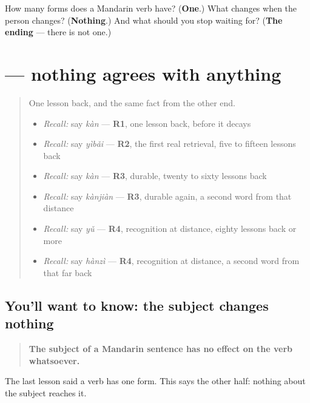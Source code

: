 \begin{tcolorbox}[breakable,colback=teal!4,colframe=teal!35!black,title={Before you move on}]
How many forms does a Mandarin verb have? (\textbf{One}.) What changes when the person changes? (\textbf{Nothing}.) And what should you stop waiting for? (\textbf{The ending} — there is not one.)
\end{tcolorbox}
\section[\texorpdfstring{\zh{我是} — \zh{你是} — \zh{人是} (wǒ shì)}{我是 — 你是 — 人是 (wǒ shì)}]{ — nothing agrees with anything}

\label{lesson:ZH-C22-buyizhi}



\begin{quote}
One lesson back, and the same fact from the other end.

\begin{itemize}
\raggedright
  \item \emph{Recall:} say \emph{kàn} — \textbf{R1}, one lesson back, before it decays
  \item \emph{Recall:} say \emph{yìbǎi} — \textbf{R2}, the first real retrieval, five to fifteen lessons back
  \item \emph{Recall:} say \emph{kàn} — \textbf{R3}, durable, twenty to sixty lessons back
  \item \emph{Recall:} say \emph{kànjiàn} — \textbf{R3}, durable again, a second word from that distance
  \item \emph{Recall:} say \emph{yǔ} — \textbf{R4}, recognition at distance, eighty lessons back or more
  \item \emph{Recall:} say \emph{hànzì} — \textbf{R4}, recognition at distance, a second word from that far back
\end{itemize}
\end{quote}

\subsection*{You'll want to know: the subject changes nothing}
\begin{quote}
\textbf{The subject of a Mandarin sentence has no effect on the verb whatsoever.}
\end{quote}

The last lesson said a verb has one form. This says the other half: nothing about the subject reaches it.

